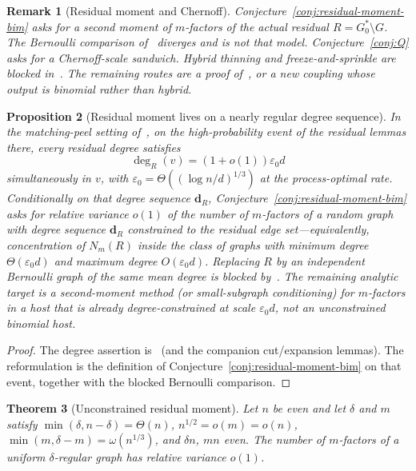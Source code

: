 \documentclass[11pt]{article}
\newtheorem{theorem}{Theorem}
\newtheorem{proposition}[theorem]{Proposition}
\newtheorem{remark}[theorem]{Remark}
\begin{document}
\begin{remark}[Residual moment and Chernoff]
\label{rem:b3-b4}
Conjecture~\ref{conj:residual-moment-bim} asks for a second moment of \(m\)-factors
of the actual residual \(R=G^*_0\setminus G\).
The Bernoulli comparison of~\cite{PlusOneV1} diverges and is not that model.
Conjecture~\ref{conj:Q} asks for a Chernoff-scale sandwich.
Hybrid thinning and freeze-and-sprinkle are blocked in~\cite{PlusOneV1}.
The remaining routes are a proof of~\cite[Conjecture~1.3]{BIM25}, or a new
coupling whose output is binomial rather than hybrid.
\end{remark}

\begin{proposition}[Residual moment lives on a nearly regular degree sequence]
\label{prop:residual-nearly-reg}
In the matching-peel setting of~\cite{PlusOneV1}, on the high-probability event
of the residual lemmas there, every residual degree satisfies
\[
\deg_R(v)=(1+o(1))\varepsilon_0 d
\]
simultaneously in \(v\), with \(\varepsilon_0=\Theta((\log n/d)^{1/3})\) at the
process-optimal rate.
Conditionally on that degree sequence \(\mathbf{d}_R\), Conjecture~\ref{conj:residual-moment-bim}
asks for relative variance \(o(1)\) of the number of \(m\)-factors of a random
graph with degree sequence \(\mathbf{d}_R\) constrained to the residual edge
set---equivalently, concentration of \(N_m(R)\) inside the class of graphs with
minimum degree \(\Theta(\varepsilon_0 d)\) and maximum degree
\(O(\varepsilon_0 d)\).
Replacing \(R\) by an independent Bernoulli graph of the same mean degree is
blocked by~\cite[Proposition~bernoulli-moment]{PlusOneV1}.
The remaining analytic target is a second-moment method (or small-subgraph
conditioning) for \(m\)-factors in a host that is already degree-constrained at
scale \(\varepsilon_0 d\), not an unconstrained binomial host.
\end{proposition}

\begin{proof}
The degree assertion is~\cite[Lemma~residual-sharp]{PlusOneV1} (and the
companion cut/expansion lemmas).
The reformulation is the definition of Conjecture~\ref{conj:residual-moment-bim}
on that event, together with the blocked Bernoulli comparison.
\end{proof}

\begin{theorem}[Unconstrained residual moment]
\label{thm:residual-unconstrained}
Let \(n\) be even and let \(\delta\) and \(m\) satisfy \(\min(\delta,n-\delta)=\Theta(n)\),
\(n^{1/2}=o(m)=o(n)\), \(\min(m,\delta-m)=\omega(n^{1/3})\), and \(\delta n\), \(mn\) even.
The number of \(m\)-factors of a uniform \(\delta\)-regular graph has relative
variance \(o(1)\).
\end{theorem}
\end{document}
